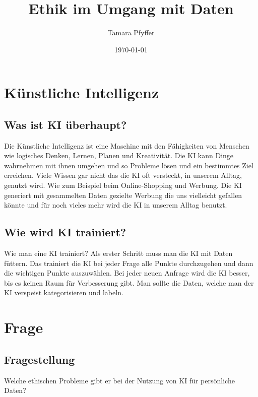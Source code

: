 \documentclass{report}
\title{Ethik im Umgang mit Daten}
\author{Tamara Pfyffer}
\date{\today}
\begin{document}
\maketitle

\tableofcontents

\chapter{Künstliche Intelligenz}

\section{Was ist KI überhaupt?}
Die Künstliche Intelligenz ist eine Maschine mit den Fähigkeiten von Menschen wie logisches Denken, Lernen, Planen und Kreativität. Die KI kann
Dinge wahrnehmen mit ihnen umgehen und so Probleme lösen und ein bestimmtes Ziel erreichen. Viele Wissen gar nicht das die KI oft versteckt,
in unserem Alltag, genutzt wird. Wie zum Beispiel beim Online-Shopping
und Werbung. Die KI generiert mit gesammelten Daten gezielte Werbung
die uns vielleicht gefallen könnte und für noch vieles mehr wird die KI in
unserem Alltag benutzt.

\section{Wie wird KI trainiert?}
Wie man eine KI trainiert? Als erster Schritt muss man die KI mit Daten
füttern. Das trainiert die KI bei jeder Frage alle Punkte durchzugehen und
dann die wichtigen Punkte auszuwählen. Bei jeder neuen Anfrage wird die
KI besser, bis es keinen Raum für Verbesserung gibt. Man sollte die Daten,
welche man der KI verspeist kategorisieren und labeln.

\chapter{Frage}

\section{Fragestellung}
Welche ethischen Probleme gibt er bei der Nutzung von KI für persönliche Daten?
\end{document}
